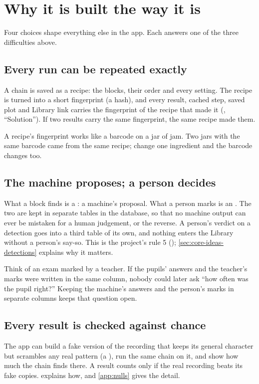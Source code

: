 \section{Why it is built the way it is}\label{sec:why-built}
Four choices shape everything else in the app. Each answers one of the three difficulties
above.

\subsection*{Every run can be repeated exactly}
A chain is saved as a recipe: the blocks, their order and every setting. The recipe is
turned into a short fingerprint (a hash), and every result, cached step, saved plot and
Library link carries the fingerprint of the recipe that made it
(, ``Solution''). If two results carry the same fingerprint, the
same recipe made them.

\begin{plainterms}[Fingerprints]
A recipe's fingerprint works like a barcode on a jar of jam. Two jars with the same barcode
came from the same recipe; change one ingredient and the barcode changes too.
\end{plainterms}

\subsection*{The machine proposes; a person decides}
What a block finds is a : a machine's proposal. What a person
marks is an . The two are kept in separate tables in the
database, so that no machine output can ever be mistaken for a human judgement, or the
reverse. A person's verdict on a detection goes into a third table of its own, and nothing
enters the Library without a person's say-so. This is the project's rule 5
(); \cref{sec:core-ideas-detections} explains why it matters.

\begin{plainterms}
Think of an exam marked by a teacher. If the pupils' answers and the teacher's marks were
written in the same column, nobody could later ask ``how often was the pupil right?''
Keeping the machine's answers and the person's marks in separate columns keeps that question
open.
\end{plainterms}

\subsection*{Every result is checked against chance}
The app can build a fake version of the recording that keeps its general character but
scrambles any real pattern (a ), run the same chain on it, and
show how much the chain finds there. A result counts only if the real recording beats its
fake copies.  explains how, and \cref{app:nulls} gives the detail.

